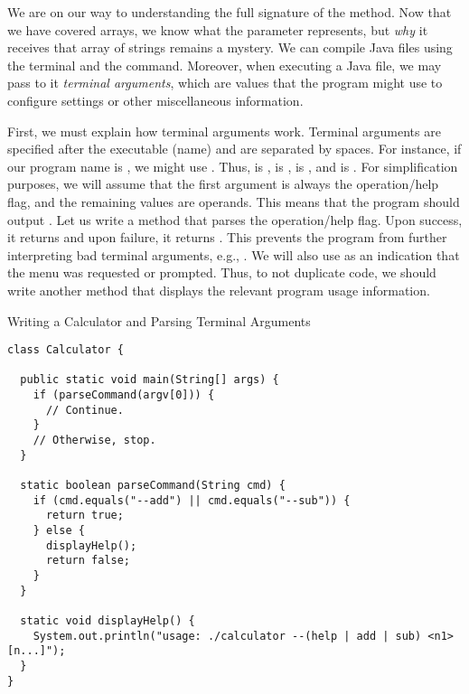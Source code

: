 We are on our way to understanding the full signature of the  method. Now that we have covered arrays, we know what the  parameter represents, but \emph{why} it receives that array of strings remains a mystery. We can compile Java files using the terminal and the  command. Moreover, when executing a Java file, we may pass to it \emph{terminal arguments}, which are values that the program might use to configure settings or other miscellaneous information.


First, we must explain how terminal arguments work. Terminal arguments are specified after the executable (name) and are separated by spaces. For instance, if our program name is , we might use . Thus,  is ,  is ,  is , and  is . For simplification purposes, we will assume that the first argument is always the operation/help flag, and the remaining values are operands. This means that the program should output . Let us write a method that parses the operation/help flag. Upon success, it returns  and upon failure, it returns . This prevents the program from further interpreting bad terminal arguments, e.g., . We will also use  as an indication that the  menu was requested or prompted. Thus, to not duplicate code, we should write another method that displays the relevant program usage information.

\begin{cl}[]{Writing a Calculator and Parsing Terminal Arguments}
\begin{lstlisting}[language=MyJava]
class Calculator {

  public static void main(String[] args) {
    if (parseCommand(argv[0])) {
      // Continue.
    }
    // Otherwise, stop.
  }

  static boolean parseCommand(String cmd) {
    if (cmd.equals("--add") || cmd.equals("--sub")) {
      return true;
    } else {
      displayHelp();
      return false;
    }
  }

  static void displayHelp() {
    System.out.println("usage: ./calculator --(help | add | sub) <n1> [n...]");
  }
}
\end{lstlisting}
\end{cl}

